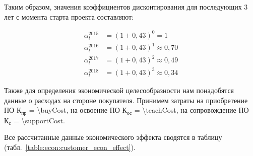 Таким образом, значения коэффициентов дисконтирования для последующих 3 лет с момента старта проекта составляют:

\begin{equation}
  \label{eq:econ:discount_factor}
  \begin{aligned}
    \alpha^{2015}_t &= (1 + 0,43)^{0} = 1 \\
    \alpha^{2016}_t &= (1 + 0,43)^{1} \approx 0,70 \\
    \alpha^{2017}_t &= (1 + 0,43)^{2} \approx 0,49 \\
    \alpha^{2018}_t &= (1 + 0,43)^{3} \approx 0,34
  \end{aligned}
\end{equation}



\FPeval{\resultCostDiffOne}{\deltaAddIncomeOne}
\FPeval{\resultCostDiffTwo}{\deltaAddIncomeTwo}
\FPeval{\resultCostDiffThree}{\deltaAddIncomeThree}


Также для определения экономической целесообразности нам понадобятся данные о расходах на стороне покупателя.
Принимем затраты на приобретение ПО $ \text{К}_\text{пр} $ = \SI{\buyCost}{\byr},
на освоение ПО $ \text{К}_\text{ос} $ = \SI{\teachCost}{\byr},
на сопровождение ПО $ \text{К}_\text{с} $ = \SI{\supportCost}{\byr}.

Все рассчитанные данные экономического эффекта сводятся в таблицу (табл.~\ref{table:econ:customer_econ_effect}).

